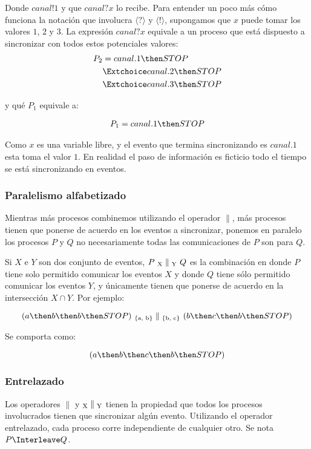 Donde $canal!1$ y que $canal?x$ lo recibe. Para entender un poco más cómo funciona la notación que involucra $\langle ? \rangle$ y $\langle ! \rangle$, supongamos que $x$ puede tomar los valores $1$, $2$ y $3$. La expresión $canal?x$ equivale a un proceso que está dispuesto a sincronizar con todos estos potenciales valores:
\begin{align*}
P_2 & =  canal.1 \then STOP \\
      & \Extchoice canal.2 \then STOP \\
      & \Extchoice canal.3 \then STOP 
\end{align*}

y qué $P_1$ equivale a: 

\begin{align*}
P_1  = canal.1 \then STOP \\
\end{align*}

Como $x$ es una variable libre, y el evento que termina sincronizando es $canal.1$ esta toma el valor $1$. En realidad el paso de información es ficticio todo el tiempo se está sincronizando en eventos.

\subsubsection*{Paralelismo alfabetizado}

Mientras más procesos combinemos utilizando el operador $\parallel$, más procesos tienen que ponerse de acuerdo en los eventos a sincronizar, ponemos en paralelo los procesos $P$ y $Q$ no necesariamente todas las comunicaciones de $P$ son para $Q$.

Si $X$ e $Y$ son dos conjunto de eventos, $P\ \textsubscript{X}\parallel\textsubscript{Y}\ Q$ es la combinación en donde $P$ tiene solo permitido comunicar los eventos $X$ y donde $Q$ tiene sólo permitido comunicar los eventos $Y$, y únicamente tienen que ponerse de acuerdo en la intersección $X \cap Y$. Por ejemplo:

\[ 
 ( a \then b \then b \then STOP )\  \textsubscript{\{a, b\}} \parallel \textsubscript{\{b, c\}}\ ( b \then c \then b \then STOP ) 
\]

Se comporta como:

\[ 
 ( a \then b \then c \then b \then STOP )
\]

\subsubsection*{Entrelazado}
Los operadores $\parallel$ y $\textsubscript{X}\parallel\textsubscript{Y}$ tienen la propiedad que todos los procesos involucrados tienen que sincronizar algún evento. Utilizando el operador entrelazado, cada proceso corre independiente de cualquier otro. Se nota $P \Interleave Q$.

